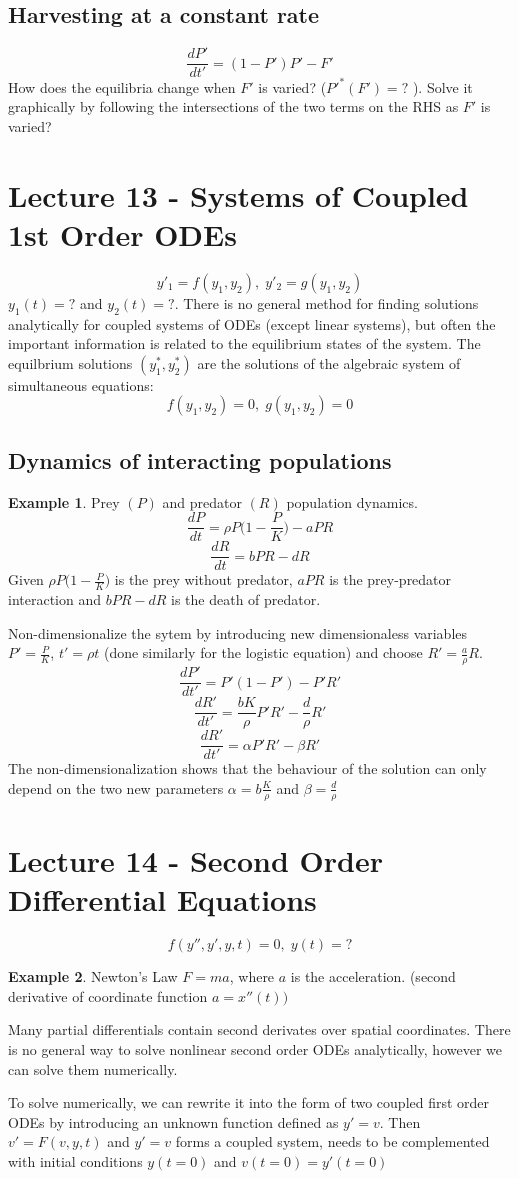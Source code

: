 \documentclass{report}
\theoremstyle{definition}
\newtheorem{example}{Example}
\theoremstyle{plain}
\theoremstyle{remark}
\begin{document}
\subsection{Harvesting at a constant rate}
$$ \frac{dP'}{dt'} = (1-P')P' - F' $$
How does the equilibria change when $ F' $ is varied? ($P'^*(F') = ? $ ). Solve
it graphically by following the intersections of the two terms on the RHS as
$ F' $ is varied?

\section{Lecture 13 - Systems of Coupled 1st Order ODEs}
$$ y'_1 = f(y_1,y_2), \; y'_2 = g(y_1, y_2) $$
$ y_1(t) = ? $ and $ y_2(t) = ? $. There is no general method for finding
solutions analytically for coupled systems of ODEs (except linear systems), but
often the important information is related to the equilibrium states of the
system. The equilbrium solutions $ (y_1^*, y_2^*) $ are the solutions of the
algebraic system of simultaneous equations:
$$ f(y_1, y_2) = 0 , \; g(y_1, y_2)  = 0 $$
\subsection{Dynamics of interacting populations}
\begin{example}
  Prey $ (P) $ and predator $ (R) $ population dynamics.
  $$ \frac{dP}{dt} = \rho P \Big (1 - \frac{P}{K}\Big) - aPR $$
  $$ \frac{dR}{dt} = bPR - dR $$
  Given $ \displaystyle \rho P\Big ( 1 - \frac{P}{K}\Big ) $ is the prey without predator,
  $ aPR $ is the prey-predator interaction and $ bPR - dR $ is the death of
  predator.
\end{example}
Non-dimensionalize the sytem by introducing new dimensionaless variables $ P'
= \displaystyle \frac{P}{K} $, $ t' = \rho t $ (done similarly for the logistic equation) and
choose $ R' = \displaystyle \frac{a}{\rho} R$. 
$$ \frac{dP'}{dt'} = P'(1-P') - P'R' $$
$$ \frac{dR'}{dt'} = \frac{bK}{\rho} P'R' - \frac{d}{\rho} R' $$
$$ \frac{dR'}{dt'} = \alpha P' R' - \beta R' $$
The non-dimensionalization shows that the behaviour of the solution can only
depend on the two new parameters $ \alpha = b \displaystyle \frac{K}{\rho}
$ and $ \beta = \displaystyle \frac{d}{\rho} $
\section{Lecture 14 - Second Order Differential Equations}
$$ f(y'', y', y,t) = 0, \; y(t) = ?$$
\begin{example}
  Newton's Law $ F = ma $, where $ a $ is the acceleration. (second derivative
  of coordinate function $ a = x''(t)) $
\end{example}
Many partial differentials contain second derivates over spatial coordinates.
There is no general way to solve nonlinear second order ODEs analytically,
however we can solve them numerically.
\par 
To solve numerically, we can rewrite it into the form of two coupled first
order ODEs by introducing an unknown function defined as $ y' = v $. Then $ v'
= F(v,y,t)$ and $ y' = v $ forms a coupled system, needs to be complemented
with initial conditions $ y(t=0)$ and $ v(t=0) = y'(t=0) $
\end{document}
